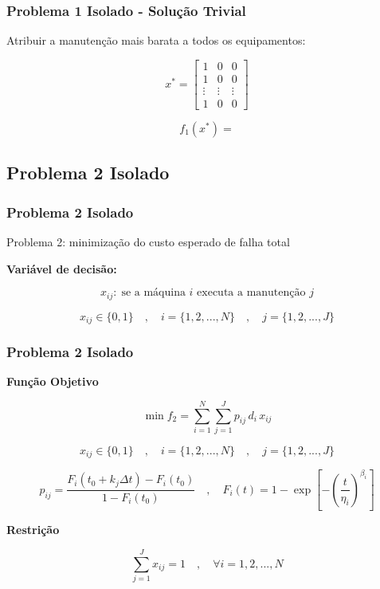 \documentclass{beamer}
\newcommand{\un}[1]{\;\text{#1}}
\begin{document}
    \begin{frame}
        \frametitle{Problema 1 Isolado - Solução Trivial}

        \begin{center}
            Atribuir a manutenção mais barata a todos os equipamentos:
        \end{center}


        \[ x^{*} = \begin{bmatrix} 
            1 & 0 & 0 \\
            1 & 0 & 0 \\
            \vdots & \vdots & \vdots \\
            1 &  0      & 0 
            \end{bmatrix} \]

        \vspace{1cm}

       \[ f_1\left(x^{*}\right) =   \]
    \end{frame}

    \subsection{Problema 2 Isolado}
    \begin{frame}
        \frametitle{Problema 2 Isolado}

        \begin{center}
            Problema 2: minimização do custo esperado de falha total
        \end{center}

        \vspace{0.5cm}

        \textbf{Variável de decisão:}

        \[  x_{ij}: \un{se a máquina $i$ executa a manutenção $j$}  \]
        
        \[ x_{ij} \in \{0,1\} \quad , \quad i = \{1, 2, ..., N\}  \quad , \quad j = \{1, 2, ..., J\} \]

    \end{frame}

    \begin{frame}
        \frametitle{Problema 2 Isolado}

        \textbf{Função Objetivo}

        \[  \min f_2 = \sum_{i=1}^{N} \sum_{j=1}^{J} p_{ij} \, d_i \, x_{ij} \]

        \[ x_{ij} \in \{0,1\} \quad , \quad i = \{1, 2, ..., N\}  \quad , \quad j = \{1, 2, ..., J\} \]

        \[ 
        p_{ij} = \frac{F_i \left(t_0 + k_j \Delta t \right) - F_i\left(t_0\right) }{1 - F_i\left(t_0\right)}
        \quad , \quad 
        F_i(t) = 1 - \exp \left[ - \left( \frac{t}{\eta_i} \right)^{\beta_i} \right] 
        \]

        \vspace{0.5cm}
        
        \textbf{Restrição}

        \[ \sum_{j=1}^{J} x_{ij} = 1 \quad , \quad \forall i = {1, 2, ..., N} \]
    \end{frame}
\end{document}
